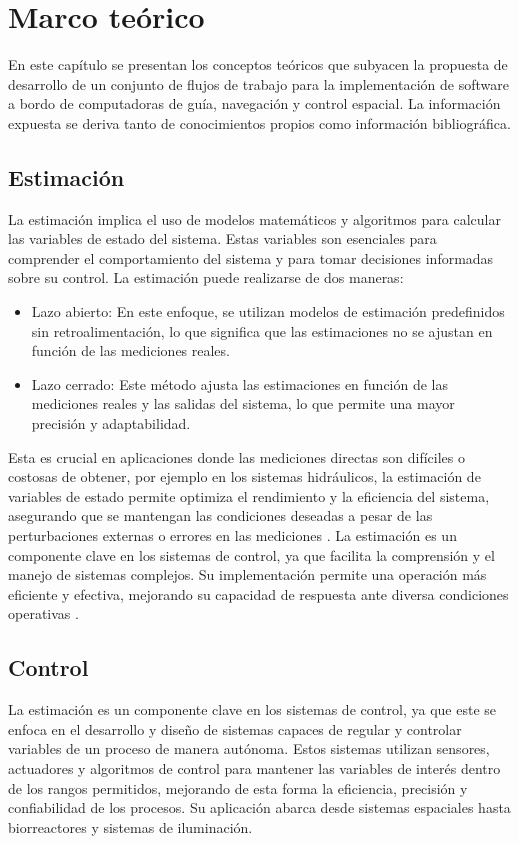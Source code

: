 \chapter{Marco teórico}
\label{ch:marco}

En este capítulo se presentan los conceptos teóricos que subyacen la propuesta de desarrollo de un conjunto de flujos de trabajo para la implementación de software 
a bordo de computadoras de guía, navegación y control espacial. La información expuesta se deriva tanto de conocimientos propios como información bibliográfica.

\section{Estimación}
La estimación implica el uso de modelos matemáticos y algoritmos para calcular las variables de estado del sistema. Estas variables son esenciales para comprender 
el comportamiento del sistema y para tomar decisiones informadas sobre su control. La estimación puede realizarse de dos maneras:

\begin{itemize}
    \item Lazo abierto: En este enfoque, se utilizan modelos de estimación predefinidos sin retroalimentación, lo que significa que las estimaciones no se ajustan en función
    de las mediciones reales.
    \item Lazo cerrado: Este método ajusta las estimaciones en función de las mediciones reales y las salidas del sistema, lo que permite una mayor precisión y adaptabilidad.
\end{itemize}

Esta es crucial en aplicaciones donde las mediciones directas son difíciles o costosas de obtener, por ejemplo en los sistemas hidráulicos, la estimación de variables de 
estado permite optimiza el rendimiento y la eficiencia del sistema, asegurando que se mantengan las condiciones deseadas a pesar de las perturbaciones externas o errores en las 
mediciones \cite{Merchn2019EvaluacinDM}. La estimación es un componente clave en los sistemas de control, ya que facilita la comprensión y el manejo de sistemas complejos. 
Su implementación permite una operación más eficiente y efectiva, mejorando su capacidad de respuesta ante diversa condiciones operativas \cite{Mesa2020EstimacinDV}.

\section{Control}
La estimación es un componente clave en los sistemas de control, ya que este se enfoca en el desarrollo y diseño de sistemas capaces de regular y controlar variables de un proceso de manera autónoma. Estos sistemas utilizan sensores, actuadores y algoritmos de control para mantener las variables de interés dentro de los rangos permitidos, mejorando de esta forma la eficiencia, precisión y confiabilidad de los procesos. Su aplicación abarca desde sistemas espaciales hasta biorreactores y sistemas de iluminación. 


